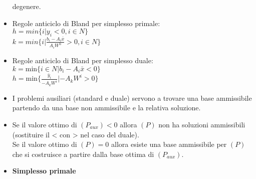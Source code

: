 \documentclass[fleqn,12pt]{article}
\begin{document}
\begin{itemize}
        degenere.
    \item Regole anticiclo di Bland per simplesso primale: \\
        $h = min\{i | y_i < 0, i \in N\}$ \\
        $k = min\{i | \frac{b_i - A_i\bar{x}}{A_iW^h} > 0, i \in N\} $
    \item Regole anticiclo di Bland per simplesso duale: \\
        $k = \text{min}\{i \in N | b_i - A_i\bar{x} < 0\}$ \\
        $h = \text{min}\{\frac{\bar{y}_i}{-A_kW^i} | -A_kW^i > 0\}$
    \item I problemi ausiliari (standard e duale) servono a trovare una base
        ammissibile partendo da una base non ammissibile e la relativa
        soluzione.
    \item Se il valore ottimo di $(P_{aux}) < 0$ allora $(P)$ non ha soluzioni
        ammissibili (sostituire il < con > nel caso del duale). \\
        Se il valore ottimo di $(P) = 0$ allora esiste una base ammissibile per
        $(P)$ che si costruisce a partire dalla base ottima di $(P_{aux})$.
    \item \textbf{Simplesso primale}
\end{itemize}
\end{document}
